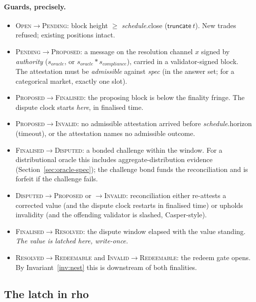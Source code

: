 \documentclass[11pt]{article}
\newcommand{\sep}{\mathbin{\ast}}
\begin{document}
\paragraph{Guards, precisely.}
\begin{itemize}[leftmargin=1.4em,itemsep=0.15em]
\item \textsc{Open}$\to$\textsc{Pending}: block height $\ge$ \textit{schedule}.close
($\textsf{truncate}\ t$). New trades refused; existing positions intact.
\item \textsc{Pending}$\to$\textsc{Proposed}: a message on the resolution channel $x$ signed
by \textit{authority} ($s_{\mathit{oracle}}$, or $s_{\mathit{oracle}}\sep s_{\mathit{compliance}}$),
carried in a validator-signed block. The attestation must be \emph{admissible} against
\textit{spec} (in the answer set; for a categorical market, exactly one slot).
\item \textsc{Proposed}$\to$\textsc{Finalised}: the proposing block is below the finality
fringe. The dispute clock starts \emph{here}, in finalised time.
\item \textsc{Proposed}$\to$\textsc{Invalid}: no admissible attestation arrived before
\textit{schedule}.horizon (timeout), or the attestation names no admissible outcome.
\item \textsc{Finalised}$\to$\textsc{Disputed}: a bonded challenge within the window. For a
distributional oracle this includes aggregate-distribution evidence
(Section~\ref{sec:oracle-spec}); the challenge bond funds the reconciliation and is forfeit if
the challenge fails.
\item \textsc{Disputed}$\to$\textsc{Proposed} or $\to$\textsc{Invalid}: reconciliation either
re-attests a corrected value (and the dispute clock restarts in finalised time) or upholds
invalidity (and the offending validator is slashed, Casper-style).
\item \textsc{Finalised}$\to$\textsc{Resolved}: the dispute window elapsed with the value
standing. \emph{The value is latched here, write-once.}
\item \textsc{Resolved}$\to$\textsc{Redeemable} and \textsc{Invalid}$\to$\textsc{Redeemable}:
the redeem gate opens. By Invariant~\ref{inv:nest} this is downstream of both finalities.
\end{itemize}

\subsection{The latch in rho}
\end{document}
